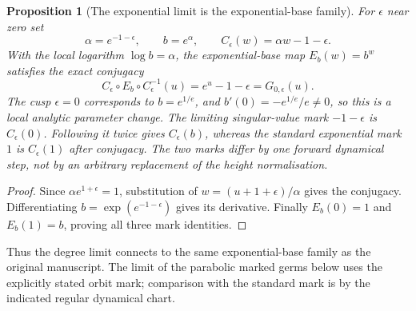 \documentclass[11pt]{article}
\newtheorem{proposition}[theorem]{Proposition}
\begin{document}
\begin{proposition}[The exponential limit is the exponential-base family]
\label{prop:degree-tetration}
For $\epsilon$ near zero set
\[
 \alpha=e^{-1-\epsilon},\qquad b=e^\alpha,\qquad
 C_\epsilon(w)=\alpha w-1-\epsilon.
\]
With the local logarithm $\log b=\alpha$, the exponential-base map
$E_b(w)=b^w$ satisfies the exact conjugacy
\[
 C_\epsilon\circ E_b\circ C_\epsilon^{-1}(u)
   =e^u-1-\epsilon=G_{0,\epsilon}(u).
\]
The cusp $\epsilon=0$ corresponds to $b=e^{1/e}$, and
$b'(0)=-e^{1/e}/e\ne0$, so this is a local analytic parameter change.
The limiting singular-value mark $-1-\epsilon$ is $C_\epsilon(0)$.
Following it twice gives $C_\epsilon(b)$, whereas the standard
exponential mark $1$ is $C_\epsilon(1)$ after conjugacy. The two
marks differ by one forward dynamical step, not by an arbitrary
replacement of the height normalisation.
\end{proposition}
\begin{proof}
Since $\alpha e^{1+\epsilon}=1$, substitution of
$w=(u+1+\epsilon)/\alpha$ gives the conjugacy. Differentiating
$b=\exp(e^{-1-\epsilon})$ gives its derivative. Finally
$E_b(0)=1$ and $E_b(1)=b$, proving all three mark identities.
\end{proof}
Thus the degree limit connects to the same exponential-base family
as the original manuscript. The limit of the parabolic marked germs
below uses the explicitly stated orbit mark; comparison with the
standard mark is by the indicated regular dynamical chart.
\end{document}
